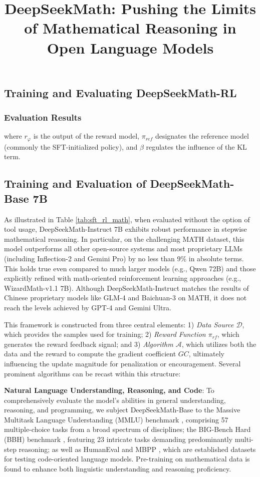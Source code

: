 \title{DeepSeekMath: Pushing the Limits of Mathematical Reasoning in Open Language Models}
\subsection{Training and Evaluating DeepSeekMath-RL}

\subsubsection{Evaluation Results}

where $r_\varphi$ is the output of the reward model, $\pi_{ref}$ designates the reference model (commonly the SFT-initialized policy), and $\beta$ regulates the influence of the KL term.

\subsection{Training and Evaluation of DeepSeekMath-Base 7B}

As illustrated in Table \ref{tab:sft_rl_math}, when evaluated without the option of tool usage, DeepSeekMath-Instruct 7B exhibits robust performance in stepwise mathematical reasoning. In particular, on the challenging MATH dataset, this model outperforms all other open-source systems and most proprietary LLMs (including Inflection-2 and Gemini Pro) by no less than 9\% in absolute terms. This holds true even compared to much larger models (e.g., Qwen 72B) and those explicitly refined with math-oriented reinforcement learning approaches (e.g., WizardMath-v1.1 7B). Although DeepSeekMath-Instruct matches the results of Chinese proprietary models like GLM-4 and Baichuan-3 on MATH, it does not reach the levels achieved by GPT-4 and Gemini Ultra.

This framework is constructed from three central elements: 1) \textit{Data Source $\mathcal{D}$}, which provides the samples used for training; 2) \textit{Reward Function $\pi_{{rf}}$}, which generates the reward feedback signal; and 3) \textit{Algorithm $\mathcal{A}$}, which utilizes both the data and the reward to compute the gradient coefficient $GC$, ultimately influencing the update magnitude for penalization or encouragement. Several prominent algorithms can be recast within this structure:

\item \textbf{Natural Language Understanding, Reasoning, and Code}: To comprehensively evaluate the model’s abilities in general understanding, reasoning, and programming, we subject DeepSeekMath-Base to the Massive Multitask Language Understanding (MMLU) benchmark \citep{mmlu}, comprising 57 multiple-choice tasks from a broad spectrum of disciplines; the BIG-Bench Hard (BBH) benchmark \citep{bbh}, featuring 23 intricate tasks demanding predominantly multi-step reasoning; as well as HumanEval \citep{codex} and MBPP \citep{mbpp}, which are established datasets for testing code-oriented language models. Pre-training on mathematical data is found to enhance both linguistic understanding and reasoning proficiency.

